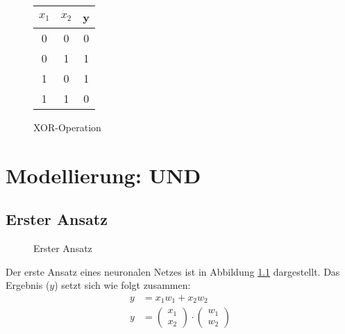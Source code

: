 \documentclass[a4paper]{report}
\begin{document}
\begin{figure}[ht]
    \centering
    \begin{tabular}{|c|c|c|}
        \hline
        $x_1$ & $x_2$ & y \\
        \hline
        0 & 0 & 0 \\
        \hline
        0 & 1 & 1 \\
        \hline
        1 & 0 & 1 \\
        \hline
        1 & 1 & 0 \\
        \hline
    \end{tabular}
    \caption{XOR-Operation}
\end{figure}

\chapter{Modellierung: UND}
\section{Erster Ansatz}
\begin{figure}[ht]
    \centering
    \caption{Erster Ansatz}
    \label{fig:net0}
\end{figure}

Der erste Ansatz eines neuronalen Netzes ist in Abbildung \ref{fig:net0} dargestellt.
Das Ergebnis ($y$) setzt sich wie folgt zusammen:
\begin{align}
    y&=x_1w_1+x_2w_2 \\
    y&=\begin{pmatrix} x_1 \\ x_2 \end{pmatrix}\cdot\begin{pmatrix} w_1 \\ w_2 \end{pmatrix}
\end{align}
\end{document}
